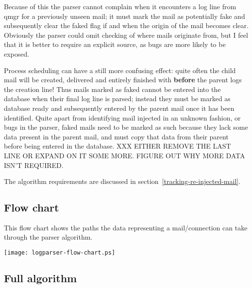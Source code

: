 \documentclass[a4paper,12pt,draft]{article}
\begin{document}
\begin{enumerate}
        Because of this the parser cannot complain when it encounters a log
        line from qmgr for a previously unseen mail; it must mark the mail
        as potentially fake and subsequently clear the faked flag if and
        when the origin of the mail becomes clear.  Obviously the parser
        could omit checking of where mails originate from, but I feel that
        it is better to require an explicit source, as bugs are more likely
        to be exposed.

        Process scheduling can have a still more confusing effect: quite
        often the child mail will be created, delivered and entirely
        finished with \textbf{before} the parent logs the creation line!
        Thus mails marked as faked cannot be entered into the database when
        their final log line is parsed; instead they must be marked as
        database ready and subsequently entered by the parent mail once it
        has been identified.  Quite apart from identifying mail injected in
        an unknown fashion, or bugs in the parser, faked mails need to be
        marked as such because they lack some data present in the parent
        mail, and must copy that data from their parent before being
        entered in the database.  XXX EITHER REMOVE THE LAST LINE OR EXPAND
        ON IT SOME MORE.  FIGURE OUT WHY MORE DATA ISN'T REQUIRED.

        The algorithm requirements are discussed in
        section~\ref{tracking-re-injected-mail}.


\end{enumerate}

\newpage
\subsection{Flow chart}

\label{flow-chart}

This flow chart shows the paths the data representing a mail/connection can
take through the parser algorithm.

\texttt{[image: logparser-flow-chart.ps]}

\subsection{Full algorithm}

\label{full-algorithm}
\end{document}
